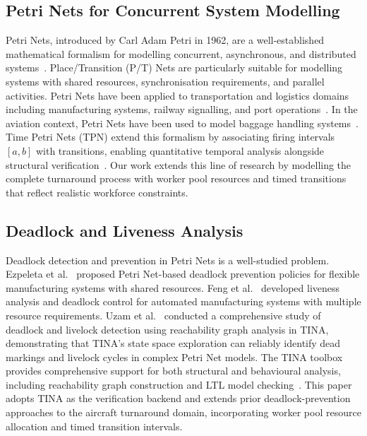 \documentclass[conference]{IEEEtran}
\begin{document}
\subsection{Petri Nets for Concurrent System Modelling}

Petri Nets, introduced by Carl Adam Petri in 1962, are a well-established
mathematical formalism for modelling concurrent, asynchronous, and distributed
systems~\cite{b9}. Place/Transition (P/T) Nets are particularly suitable for
modelling systems with shared resources, synchronisation requirements, and
parallel activities. Petri Nets have been applied to transportation and logistics
domains including manufacturing systems, railway signalling, and port
operations~\cite{b10}. In the aviation context, Petri Nets have been used to
model baggage handling systems~\cite{b12}. Time Petri Nets (TPN) extend this
formalism by associating firing intervals $[a, b]$ with transitions, enabling
quantitative temporal analysis alongside structural verification~\cite{b14}. Our
work extends this line of research by modelling the complete turnaround process
with worker pool resources and timed transitions that reflect realistic workforce
constraints.

\subsection{Deadlock and Liveness Analysis}

Deadlock detection and prevention in Petri Nets is a well-studied problem.
Ezpeleta et al.~\cite{b13} proposed Petri Net-based deadlock prevention policies
for flexible manufacturing systems with shared resources. Feng et al.~\cite{b16}
developed liveness analysis and deadlock control for automated manufacturing
systems with multiple resource requirements. Uzam et al.~\cite{b17} conducted a
comprehensive study of deadlock and livelock detection using reachability graph
analysis in TINA, demonstrating that TINA's state space exploration can reliably
identify dead markings and livelock cycles in complex Petri Net models. The TINA
toolbox provides comprehensive support for both structural and behavioural
analysis, including reachability graph construction and LTL model
checking~\cite{b14}. This paper adopts TINA as the verification backend and
extends prior deadlock-prevention approaches to the aircraft turnaround domain,
incorporating worker pool resource allocation and timed transition intervals.


\end{document}
